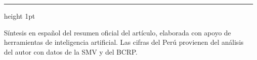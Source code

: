 \documentclass[fontsize=26pt,parskip=half-]{scrartcl}
\begin{document}
\vfill
{\color{gris}\hrule height 1pt}
\vspace{0.3em}
{\scriptsize\centering Síntesis en español del \ifdefined\FuenteSintesis\FuenteSintesis\else resumen oficial del artículo\fi, elaborada con apoyo de herramientas de inteligencia artificial. Las cifras del Perú provienen del análisis del autor con datos de la SMV y del BCRP.\par}
\end{document}
